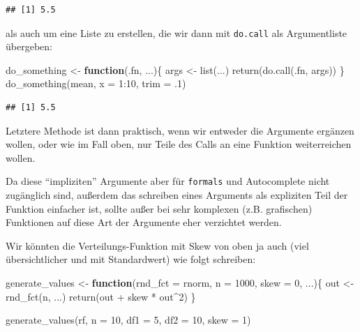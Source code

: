 \documentclass[
]{book}
\newenvironment{Shaded}{\begin{snugshade}}{\end{snugshade}}
\newcommand{\AttributeTok}[1]{\textcolor[rgb]{0.77,0.63,0.00}{#1}}
\newcommand{\ControlFlowTok}[1]{\textcolor[rgb]{0.13,0.29,0.53}{\textbf{#1}}}
\newcommand{\DecValTok}[1]{\textcolor[rgb]{0.00,0.00,0.81}{#1}}
\newcommand{\FunctionTok}[1]{\textcolor[rgb]{0.00,0.00,0.00}{#1}}
\newcommand{\NormalTok}[1]{#1}
\newcommand{\OtherTok}[1]{\textcolor[rgb]{0.56,0.35,0.01}{#1}}
\newcommand{\SpecialCharTok}[1]{\textcolor[rgb]{0.00,0.00,0.00}{#1}}
\begin{document}
\begin{verbatim}
## [1] 5.5
\end{verbatim}

als auch um eine Liste zu erstellen, die wir dann mit \texttt{do.call} als Argumentliste übergeben:

\begin{Shaded}
\begin{Highlighting}[]
\NormalTok{do\_something }\OtherTok{\textless{}{-}} \ControlFlowTok{function}\NormalTok{(.fn, ...)\{}
\NormalTok{  args }\OtherTok{\textless{}{-}} \FunctionTok{list}\NormalTok{(...)}
  \FunctionTok{return}\NormalTok{(}\FunctionTok{do.call}\NormalTok{(.fn, args))}
\NormalTok{\}}
\FunctionTok{do\_something}\NormalTok{(mean, }\AttributeTok{x =} \DecValTok{1}\SpecialCharTok{:}\DecValTok{10}\NormalTok{, }\AttributeTok{trim =}\NormalTok{ .}\DecValTok{1}\NormalTok{)}
\end{Highlighting}
\end{Shaded}

\begin{verbatim}
## [1] 5.5
\end{verbatim}

Letztere Methode ist dann praktisch, wenn wir entweder die Argumente ergänzen wollen, oder wie im Fall oben, nur Teile des Calls an eine Funktion weiterreichen wollen.

Da diese ``impliziten'' Argumente aber für \texttt{formals} und Autocomplete nicht zugänglich sind, außerdem das schreiben eines Arguments als expliziten Teil der Funktion einfacher ist, sollte außer bei sehr komplexen (z.B. grafischen) Funktionen auf diese Art der Argumente eher verzichtet werden.

Wir könnten die Verteilungs-Funktion mit Skew von oben ja auch (viel übersichtlicher und mit Standardwert) wie folgt schreiben:

\begin{Shaded}
\begin{Highlighting}[]
\NormalTok{generate\_values }\OtherTok{\textless{}{-}} \ControlFlowTok{function}\NormalTok{(}\AttributeTok{rnd\_fct =}\NormalTok{ rnorm,}
                            \AttributeTok{n =} \DecValTok{1000}\NormalTok{,}
                            \AttributeTok{skew =} \DecValTok{0}\NormalTok{,}
\NormalTok{                            ...)\{}
\NormalTok{  out }\OtherTok{\textless{}{-}} \FunctionTok{rnd\_fct}\NormalTok{(n, ...)}
  \FunctionTok{return}\NormalTok{(out }\SpecialCharTok{+}\NormalTok{ skew }\SpecialCharTok{*}\NormalTok{ out}\SpecialCharTok{\^{}}\DecValTok{2}\NormalTok{)}
\NormalTok{\}}

\FunctionTok{generate\_values}\NormalTok{(rf, }\AttributeTok{n =} \DecValTok{10}\NormalTok{, }\AttributeTok{df1 =} \DecValTok{5}\NormalTok{, }\AttributeTok{df2 =} \DecValTok{10}\NormalTok{, }\AttributeTok{skew =} \DecValTok{1}\NormalTok{)}
\end{Highlighting}
\end{Shaded}
\end{document}

